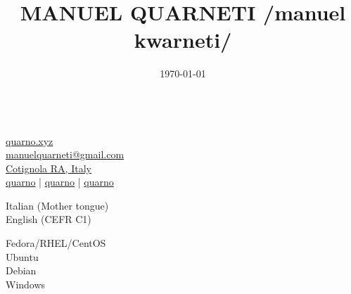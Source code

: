 \documentclass{article}
\title{\HUGE \textbf{MANUEL QUARNETI} \linebreak \huge \color{gray} /manuel kwarneti/ \\[-20pt]}
\author{}
\date{\today}
\begin{document}
\setmainfont{Inter}

\setlength{\columnsep}{20pt}
\begin{paracol}{2}

\begin{tcolorbox}[colback=white]
    \small \center

    \vspace{20pt}

     \\[20pt]

    \href{https://quarno.xyz/}{ quarno.xyz} \\[8pt]
    \href{mailto:manuelquarneti@gmail.com}{ manuelquarneti@gmail.com} \\[8pt]
    \href{https://www.openstreetmap.org/relation/43112}{ Cotignola RA, Italy} \\[8pt]
    \href{https://github.com/quarno}{ quarno} \hfill | \hfill
    \href{https://www.linkedin.com/in/quarno}{ quarno} \hfill | \hfill
    \href{https://t.me/quarno}{ quarno}
\end{tcolorbox}

\vspace{40pt}

\begin{tcolorbox}[title=\emoji{speaking-head} Languages,colback=white]
     Italian (Mother tongue) \\[4pt]
     English (CEFR C1)
\end{tcolorbox}

\begin{tcolorbox}[title=\emoji{desktop-computer} Operating Systems,colback=white]
     Fedora/RHEL/CentOS \\[4pt]
     Ubuntu \\[4pt]
     Debian \\[4pt]
     Windows
\end{tcolorbox}


\end{paracol}
\end{document}
